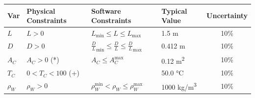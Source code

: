 \documentclass[12pt]{article}
\begin{document}
\begin{table}[!h]
  \caption{Input Variables Constraints} \label{TblInputVar}
  \renewcommand{\arraystretch}{1.2}
\noindent \begin{longtable*}{l l l l c} 
  \toprule
  \textbf{Var} & \textbf{Physical Constraints} & \textbf{Software Constraints} &
                             \textbf{Typical Value} & \textbf{Uncertainty}\\
  \midrule 
  $L$ & $L > 0$ & $L_{\text{min}} \leq L \leq L_{\text{max}}$ & 1.5 \si[per-mode=symbol] {\metre} & 10\%
  \\
  $D$ & $D > 0$ & ${\frac{D}{L}}_\text{min} \leq \frac{D}{L} \leq {\frac{D}{L}}_\text{max}$ 
	& 0.412 \si[per-mode=symbol] {\metre} & 10\%
  \\
  $A_C$ & $A_C > 0$ (*) & $A_C \leq A_C^{\text{max}}$ & 0.12 \si[per-mode=symbol] {\square\metre} & 10\%
  \\
  $T_C$ & $0 < T_C < 100$ (+)	& & 50.0 \si[per-mode=symbol] {\celsius} & 10\%
  \\
  $\rho_W$ & $\rho_W > 0$ & $\rho_W^{\text{min}} < \rho_W \leq \rho_W^{\text{max}}$ 
	& 1000 \si[per-mode=symbol] {\kilo\gram\per\cubic\metre} & 10\%

\end{longtable*}
\end{table}
\end{document}
